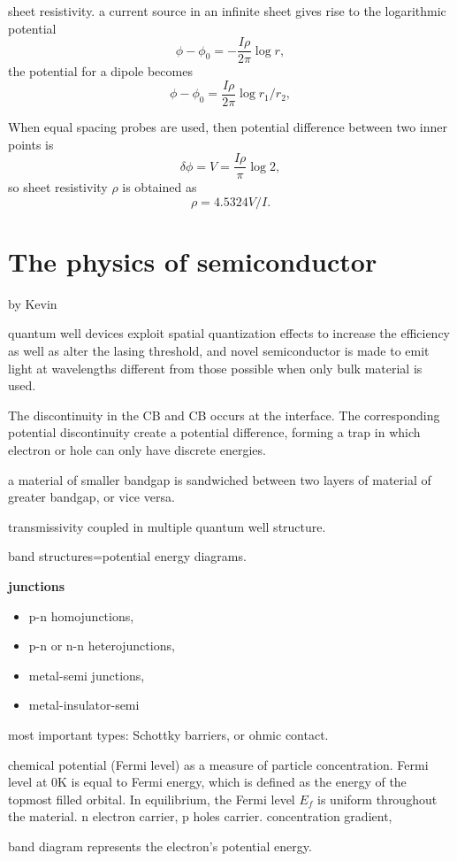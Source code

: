 sheet resistivity. a current source in an infinite sheet gives rise to the logarithmic potential
\[
\phi - \phi_0 = - \frac{I\rho}{2\pi}\log r,
\]
the potential for a dipole becomes
\[
\phi - \phi_0 = \frac{I\rho}{2\pi}\log r_1/r_2,
\]

When equal spacing probes are used, then potential difference between two inner points is 
\[
\delta\phi = V = \frac{I \rho}{\pi}\log2,
\]
so sheet resistivity $\rho$ is obtained as
\[
\rho = 4.5324V/I.
\]


\section{The physics of semiconductor}

by Kevin

quantum well devices exploit spatial quantization effects to increase the efficiency as well as alter the lasing threshold, and novel semiconductor is made to emit light at wavelengths different from those possible when only bulk material is used.

The discontinuity in the CB and CB occurs at the interface. The corresponding potential discontinuity create a potential difference, forming a trap in which electron or hole can only have discrete energies.

a material of smaller bandgap is sandwiched between two layers of material of greater bandgap, or vice versa.

transmissivity coupled in multiple quantum well structure.

band structures=potential energy diagrams.

\textbf{junctions}
\begin{itemize}
\item p-n homojunctions,
\item p-n or n-n heterojunctions,
\item metal-semi junctions, 
\item metal-insulator-semi 
\end{itemize}

most important types: Schottky barriers, or ohmic contact.

chemical potential (Fermi level) as a measure of particle concentration.  Fermi level at 0K is equal to Fermi energy, which is defined as the energy of the topmost filled orbital. In equilibrium, the Fermi level $E_f$ is uniform throughout the material. n electron carrier, p holes carrier. concentration gradient, 

band diagram represents the electron's potential energy.

